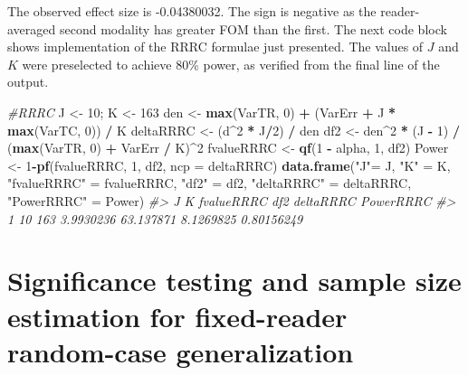 \documentclass[
]{book}
\newenvironment{Shaded}{\begin{snugshade}}{\end{snugshade}}
\newcommand{\CommentTok}[1]{\textcolor[rgb]{0.56,0.35,0.01}{\textit{#1}}}
\newcommand{\DataTypeTok}[1]{\textcolor[rgb]{0.13,0.29,0.53}{#1}}
\newcommand{\DecValTok}[1]{\textcolor[rgb]{0.00,0.00,0.81}{#1}}
\newcommand{\KeywordTok}[1]{\textcolor[rgb]{0.13,0.29,0.53}{\textbf{#1}}}
\newcommand{\NormalTok}[1]{#1}
\newcommand{\OperatorTok}[1]{\textcolor[rgb]{0.81,0.36,0.00}{\textbf{#1}}}
\newcommand{\StringTok}[1]{\textcolor[rgb]{0.31,0.60,0.02}{#1}}
\begin{document}
The observed effect size is -0.04380032. The sign is negative as the reader-averaged second modality has greater FOM than the first. The next code block shows implementation of the RRRC formulae just presented. The values of \(J\) and \(K\) were preselected to achieve 80\% power, as verified from the final line of the output.

\begin{Shaded}
\begin{Highlighting}[]
\CommentTok{#RRRC}
\NormalTok{J <-}\StringTok{ }\DecValTok{10}\NormalTok{; K <-}\StringTok{ }\DecValTok{163}
\NormalTok{den <-}\StringTok{ }\KeywordTok{max}\NormalTok{(VarTR, }\DecValTok{0}\NormalTok{) }\OperatorTok{+}\StringTok{ }\NormalTok{(VarErr }\OperatorTok{+}\StringTok{ }\NormalTok{J }\OperatorTok{*}\StringTok{ }\KeywordTok{max}\NormalTok{(VarTC, }\DecValTok{0}\NormalTok{)) }\OperatorTok{/}\StringTok{ }\NormalTok{K }
\NormalTok{deltaRRRC <-}\StringTok{ }\NormalTok{(d}\OperatorTok{^}\DecValTok{2} \OperatorTok{*}\StringTok{ }\NormalTok{J}\OperatorTok{/}\DecValTok{2}\NormalTok{) }\OperatorTok{/}\StringTok{ }\NormalTok{den}
\NormalTok{df2 <-}\StringTok{ }\NormalTok{den}\OperatorTok{^}\DecValTok{2} \OperatorTok{*}\StringTok{ }\NormalTok{(J }\OperatorTok{-}\StringTok{ }\DecValTok{1}\NormalTok{) }\OperatorTok{/}\StringTok{ }\NormalTok{(}\KeywordTok{max}\NormalTok{(VarTR, }\DecValTok{0}\NormalTok{) }\OperatorTok{+}\StringTok{ }\NormalTok{VarErr }\OperatorTok{/}\StringTok{ }\NormalTok{K)}\OperatorTok{^}\DecValTok{2}
\NormalTok{fvalueRRRC <-}\StringTok{ }\KeywordTok{qf}\NormalTok{(}\DecValTok{1} \OperatorTok{-}\StringTok{ }\NormalTok{alpha, }\DecValTok{1}\NormalTok{, df2)}
\NormalTok{Power <-}\StringTok{ }\DecValTok{1}\OperatorTok{-}\KeywordTok{pf}\NormalTok{(fvalueRRRC, }\DecValTok{1}\NormalTok{, df2, }\DataTypeTok{ncp =}\NormalTok{ deltaRRRC)}
\KeywordTok{data.frame}\NormalTok{(}\StringTok{"J"}\NormalTok{=}\StringTok{ }\NormalTok{J,  }\StringTok{"K"}\NormalTok{ =}\StringTok{ }\NormalTok{K, }\StringTok{"fvalueRRRC"}\NormalTok{ =}\StringTok{ }\NormalTok{fvalueRRRC, }\StringTok{"df2"}\NormalTok{ =}\StringTok{ }\NormalTok{df2, }\StringTok{"deltaRRRC"}\NormalTok{ =}\StringTok{ }\NormalTok{deltaRRRC, }\StringTok{"PowerRRRC"}\NormalTok{ =}\StringTok{ }\NormalTok{Power)}
\CommentTok{#>    J   K fvalueRRRC       df2 deltaRRRC  PowerRRRC}
\CommentTok{#> 1 10 163  3.9930236 63.137871 8.1269825 0.80156249}
\end{Highlighting}
\end{Shaded}

\hypertarget{significance-testing-and-sample-size-estimation-for-fixed-reader-random-case-generalization}{%
\section{Significance testing and sample size estimation for fixed-reader random-case generalization}\label{significance-testing-and-sample-size-estimation-for-fixed-reader-random-case-generalization}}
\end{document}
